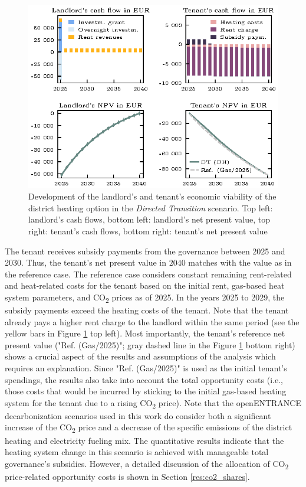 \begin{figure}[h]
	\centering
	\includegraphics[width=0.9\linewidth]{figures/4_Results/fig_DT_DH/detail.eps}
	\caption{Development of the landlord's and tenant's economic viability of the district heating option in the \textit{Directed Transition} scenario. Top left: landlord's cash flows, bottom left: landlord's net present value, top right: tenant's cash flows, bottom right: tenant's net present value}
	\label{fig:dt+dh}
\end{figure}

 The tenant receives subsidy payments from the governance between 2025 and 2030. Thus, the tenant's net present value in $2040$ matches with the value as in the reference case. The reference case considers constant remaining rent-related and heat-related costs for the tenant based on the initial rent, gas-based heat system parameters, and CO\textsubscript{2} prices as of 2025. In the years 2025 to 2029, the subsidy payments exceed the heating costs of the tenant. Note that the tenant already pays a higher rent charge to the landlord within the same period (see the yellow bars in Figure \ref{fig:dt+dh} top left). Most importantly, the tenant's reference net present value ("Ref. (Gas/2025)"; gray dashed line in the Figure \ref{fig:dt+dh} bottom right) shows a crucial aspect of the results and assumptions of the analysis which requires an explanation. Since "Ref. (Gas/2025)" is used as the initial tenant's spendings, the results also take into account the total opportunity costs (i.e., those costs that would be incurred by sticking to the initial gas-based heating system for the tenant due to a rising CO\textsubscript{2} price). Note that the openENTRANCE decarbonization scenarios used in this work do consider both a significant increase of the CO\textsubscript{2} price and a decrease of the specific emissions of the district heating and electricity fueling mix. The quantitative results indicate that the heating system change in this scenario is achieved with manageable total governance's subsidies. However, a detailed discussion of the allocation of CO\textsubscript{2} price-related opportunity costs is shown in Section \ref{res:co2_shares}.

